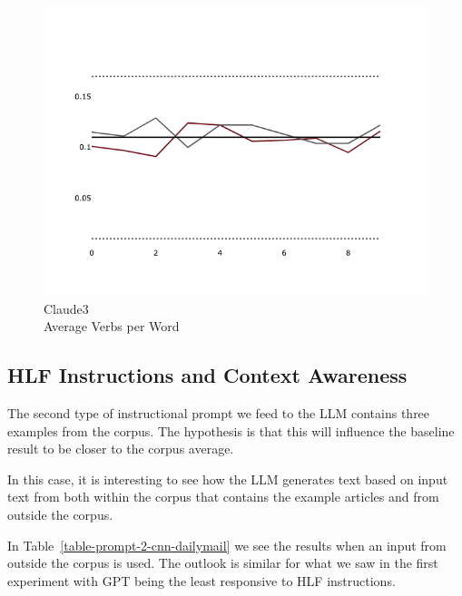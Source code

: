 \documentclass[11pt]{article}
\begin{document}
\begin{figure}[htp]
\begin{minipage}{0.32\textwidth}
        \label{fig-gpt-fkgl}
    \end{minipage}
    \hfill
    \begin{minipage}{0.32\textwidth}
        \includegraphics[width=\linewidth]{plots/prompt_1/prompt_1-claude3-cnn_dailymail/prompt_1-claude3-cnn_dailymail_a_verb_pw.png}
        \caption[center]{Claude3\\Average Verbs per Word}
        \label{fig-llama-simp-ttr}
    \end{minipage}
\end{figure}

\subsection{HLF Instructions and Context Awareness}

The second type of instructional prompt we feed to the LLM contains three
examples from the corpus.
The hypothesis is that this will influence the baseline result to be closer to
the corpus average.

In this case, it is interesting to see how the LLM generates text based on input
text from both within the corpus that contains the example articles and from
outside the corpus.

In Table~\ref{table-prompt-2-cnn-dailymail} we see the results when an input from
outside the corpus is used.
The outlook is similar for what we saw in the first experiment with GPT
being the least responsive to HLF instructions.
\end{document}
